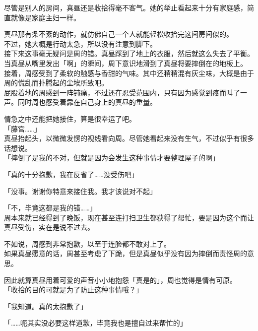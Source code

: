 尽管是别人的房间，真昼还是收拾得毫不客气。她的举止看起来十分有家庭感，简直就像是家庭主妇一样。

真昼那有条不紊的动作，就仿佛自己一个人就能轻松收拾完这间房间似的。\\

不过，她大概是行动太急，所以没有注意到脚下。\\

接下来这事毫无疑问是周的错。真昼踩到了地上的衣服，然后就这么失去了平衡。\\

当真昼从嘴里发出「啊」的瞬间，周下意识地滑到了真昼将要摔倒在的地板上。\\

接着，周感受到了柔软的触感与香甜的气味。其中还稍稍混有灰尘味，大概是由于周的慌乱而扑腾起的尘埃所致吧。\\

屁股着地的周感到一阵钝痛，不过还在忍受范围内，只有因为感觉到疼而叫了一声。同时周也感受着靠在自己身上的真昼的重量。

情急之中还能把她接住，算是很幸运了吧。\\

「藤宫……」\\

真昼抬起头，以微微发愣的视线看向周。尽管她看起来没有生气，不过似乎有很多话想说。\\

「摔倒了是我的不对，但就是因为会发生这种事情才要整理屋子的啊」

「真的十分抱歉，我在反省了……没受伤吧」

「没事。谢谢你特意来接住我。我才该说对不起」

「不，毕竟这都是我的错……」\\

周本来就已经得到了晚饭，现在甚至连打扫卫生都获得了帮忙，要是因为这个而让真昼受伤，实在是说不过去。

不如说，周感到非常抱歉，以至于连脸都不敢对上了。\\

如果真昼愿意的话，周甚至考虑了下跪，但是真昼似乎没有因为摔倒而责怪周的意思。

因此就算真昼用着可爱的声音小小地抱怨「真是的」，周也觉得是情有可原。\\

「收拾的目的可就是为了防止这种事情哦？」

「我知道。真的太抱歉了」

「……呃其实没必要这样道歉，毕竟我也是擅自过来帮忙的」\\

